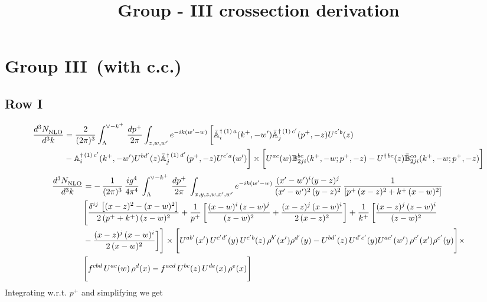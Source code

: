 \documentclass[9pt]{article}
\title{Group - III crossection derivation}
\author{}
\date{}
\def\mf#1{\mathbb{#1}}
\numberwithin{equation}{section}
\begin{document}
\maketitle
\section{Group III\, (with c.c.)}
\subsection{Row I\, }
\begin{align}
 \frac{d^{3}N_{\rm NLO}^{\rm}}{d^{3}k}  & =    \frac{2}{(2\pi)^{3}} \int_{\Lambda}^{\vee - k^{+}}\, \frac{dp^{+}}{2\pi}\int_{z,w,w^{\prime}} e^{-ik(w^{\prime}-w)}\, 
        \bigg[\Bar{\mf{A}}^{\dagger\, (1)\, a}_{i}(k^{+},-w^{\prime})\Bar{\mf{A}}^{\dagger\, (1)\, c^{\prime}}_{j}(p^{+},-z)U^{c^{\prime}b}(z)\notag \\ & -\mf{A}^{\dagger\, (1)\, c^{\prime}}_{i}(k^{+},- w^{\prime})U^{bd^{\prime}}(z)\Bar{\mf{A}}^{\dagger\, (1)\, d^{\prime}}_{j}(p^{+},-z)U^{c^{\prime}a}(w^{\prime})  \bigg]\times \bigg[U^{ac}(w) \mf{B}^{bc}_{2ji}(k^{+},-w;p^{+},-z) -U^{\dagger\, bc}(z)\Bar{\mf{B}}^{ca}_{2ji}(k^{+},-w; p^{+},-z)\bigg] \nonumber
\end{align}
\begin{align}
    \frac{d^{3}N_{\rm NLO}^{\rm}}{d^{3}k}  & =  -\,\frac{1}{(2\pi)^{3}}\,\frac{ig^{4}}{4\pi^{4}}\, \int_{\Lambda}^{\vee-k^{+}}\, \frac{dp^{+}}{2\pi}\, \int_{x,y,z,w,x',w^{\prime}} e^{-ik(w^{\prime}-w)}\, \frac{(x'-w')^{i}(y-z)^{j}}{(x'-w')^{2}\,(y-z)^{2}}\, \frac{1}{\left[p^{+}\,(x-z)^{2}+k^{+}\,(x-w)^{2}\right]}\notag \\ & \Bigg[\frac{\delta^{ij}\, \left[(x-z)^{2}-(x-w)^{2}\right]}{2\, (p^{+}+k^{+})\,(z-w)^{2}}+\frac{1}{p^{+}}\, \bigg[\frac{(x-w)^{i}\,(z-w)^{j}}{(z-w)^{2}}+\frac{(x-z)^{j}\,(x-w)^{i}}{2\,(x-z)^{2}}\bigg]+\frac{1}{k^{+}}\,\bigg[\frac{(x-z)^{j}\,(z-w)^{i}}{(z-w)^{2}}\notag \\ & -\frac{(x-z)^{j}\,(x-w)^{i}}{2\,(x-w)^{2}}\bigg]\Bigg]\times \Bigg[U^{ab'}(x')\,U^{c'd'}(y)\,U^{c'b}(z)\,\rho^{b'}(x')\rho^{d'}(y)-U^{bd'}(z)\,U^{d'e'}(y)U^{ac'}(w')\,\rho^{c'}(x')\rho^{e'}(y)\Bigg]\times \notag \\ & \Bigg[f^{cbd}\,U^{ac}(w)\,\rho^{d}(x)-f^{acd}\, U^{bc}(z)\,U^{de}(x)\,\rho^{e}(x)\Bigg]
\end{align}
Integrating w.r.t. $p^{+}$ and simplifying we get
\end{document}
